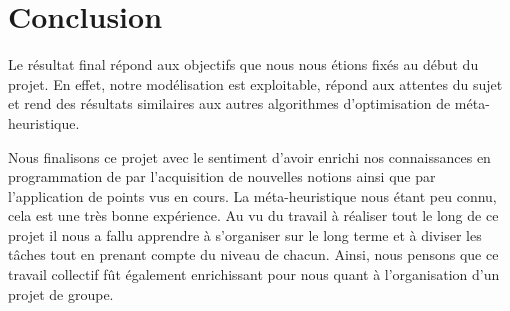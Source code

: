 \section{Conclusion}

Le résultat final répond aux objectifs que nous nous étions fixés au début du projet. En effet, notre modélisation est exploitable, répond aux attentes du sujet et rend des résultats similaires aux autres algorithmes d'optimisation de méta-heuristique.

Nous finalisons ce projet avec le sentiment d’avoir enrichi nos connaissances en programmation de par l’acquisition de nouvelles notions ainsi que par l’application de points vus en cours. La méta-heuristique nous étant peu connu, cela est une très bonne expérience. Au vu du travail à réaliser tout le long de ce projet il nous a fallu apprendre à s’organiser sur le long terme et à diviser les tâches tout en prenant compte du niveau de chacun. Ainsi, nous pensons que ce travail collectif fût également enrichissant pour nous quant à l’organisation d’un projet de groupe.